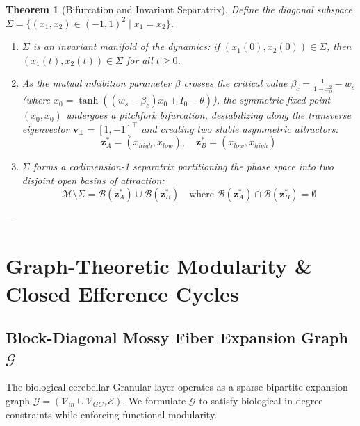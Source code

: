\documentclass[11pt,a4paper]{article}
\newtheorem{theorem}{Theorem}
\begin{document}
\begin{theorem}[Bifurcation and Invariant Separatrix]
Define the diagonal subspace $\Sigma = \{(x_1, x_2) \in (-1, 1)^2 \mid x_1 = x_2\}$. 
\begin{enumerate}
    \item $\Sigma$ is an invariant manifold of the dynamics: if $(x_1(0), x_2(0)) \in \Sigma$, then $(x_1(t), x_2(t)) \in \Sigma$ for all $t \ge 0$.
    \item As the mutual inhibition parameter $\beta$ crosses the critical value $\beta_c = \frac{1}{1 - x_0^2} - w_s$ (where $x_0 = \tanh((w_s - \beta_c)x_0 + I_0 - \theta)$), the symmetric fixed point $(x_0, x_0)$ undergoes a pitchfork bifurcation, destabilizing along the transverse eigenvector $\mathbf{v}_\perp = [1, -1]^\top$ and creating two stable asymmetric attractors:
    \begin{equation}
    \mathbf{z}_A^* = (x_{high}, x_{low}), \quad \mathbf{z}_B^* = (x_{low}, x_{high})
    \end{equation}
    \item $\Sigma$ forms a codimension-1 separatrix partitioning the phase space into two disjoint open basins of attraction:
    \begin{equation}
    \mathcal{M} \setminus \Sigma = \mathcal{B}(\mathbf{z}_A^*) \cup \mathcal{B}(\mathbf{z}_B^*) \quad \text{where } \mathcal{B}(\mathbf{z}_A^*) \cap \mathcal{B}(\mathbf{z}_B^*) = \emptyset
    \end{equation}
\end{enumerate}
\end{theorem}

---

\section{Graph-Theoretic Modularity \& Closed Efference Cycles}

\subsection{Block-Diagonal Mossy Fiber Expansion Graph $\mathcal{G}$}
The biological cerebellar Granular layer operates as a sparse bipartite expansion graph $\mathcal{G} = (\mathcal{V}_{in} \cup \mathcal{V}_{GC}, \mathcal{E})$. We formulate $\mathcal{G}$ to satisfy biological in-degree constraints while enforcing functional modularity.
\end{document}
